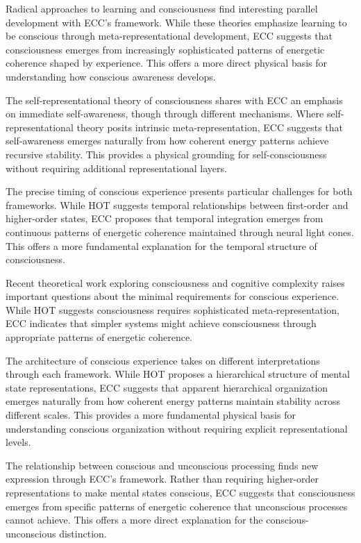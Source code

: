 \begin{refsection}
Radical approaches to learning and consciousness \cite{Cleeremans2011} find interesting parallel development with ECC's framework. While these theories emphasize learning to be conscious through meta-representational development, ECC suggests that consciousness emerges from increasingly sophisticated patterns of energetic coherence shaped by experience. This offers a more direct physical basis for understanding how conscious awareness develops.

The self-representational theory of consciousness \cite{Kriegel2009} shares with ECC an emphasis on immediate self-awareness, though through different mechanisms. Where self-representational theory posits intrinsic meta-representation, ECC suggests that self-awareness emerges naturally from how coherent energy patterns achieve recursive stability. This provides a physical grounding for self-consciousness without requiring additional representational layers.

The precise timing of conscious experience \cite{Gennaro2012} presents particular challenges for both frameworks. While HOT suggests temporal relationships between first-order and higher-order states, ECC proposes that temporal integration emerges from continuous patterns of energetic coherence maintained through neural light cones. This offers a more fundamental explanation for the temporal structure of consciousness.

Recent theoretical work exploring consciousness and cognitive complexity \cite{LeDoux2017} raises important questions about the minimal requirements for conscious experience. While HOT suggests consciousness requires sophisticated meta-representation, ECC indicates that simpler systems might achieve consciousness through appropriate patterns of energetic coherence.

The architecture of conscious experience \cite{Rosenthal2005} takes on different interpretations through each framework. While HOT proposes a hierarchical structure of mental state representations, ECC suggests that apparent hierarchical organization emerges naturally from how coherent energy patterns maintain stability across different scales. This provides a more fundamental physical basis for understanding conscious organization without requiring explicit representational levels.

The relationship between conscious and unconscious processing \cite{Armstrong1968} finds new expression through ECC's framework. Rather than requiring higher-order representations to make mental states conscious, ECC suggests that consciousness emerges from specific patterns of energetic coherence that unconscious processes cannot achieve. This offers a more direct explanation for the conscious-unconscious distinction.


\end{refsection}
